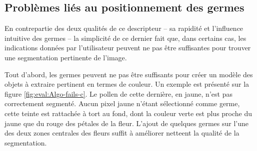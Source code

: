 \begin{emodif}
\subsection{Problèmes liés au positionnement des germes}
\label{subsec:eval:posgermes}

En contrepartie des deux qualités de ce descripteur -- sa rapidité et l'influence intuitive des germes -- la simplicité de ce dernier fait que, dans certains cas, les indications données par l'utilisateur peuvent ne pas être suffisantes pour trouver une segmentation pertinente de l'image. 

Tout d'abord, les germes peuvent ne pas être suffisants pour créer un modèle des objets à extraire pertinent en termes de couleur. Un exemple est présenté sur la figure \ref{fig:eval:Algo-fails-c}. Le pollen de cette dernière, en jaune, n'est pas correctement segmenté. Aucun pixel jaune n'étant sélectionné comme germe, cette teinte est rattachée à tort au fond, dont la couleur verte est plus proche du jaune que du rouge des pétales de la fleur. L'ajout de quelques germes sur l'une des deux zones centrales des fleurs suffit à améliorer netteent la qualité de la segmentation. 
 

\end{emodif}
